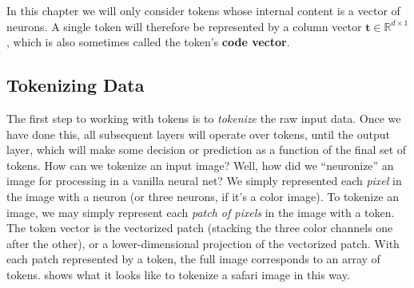 In this chapter we will only consider tokens whose internal content is a vector of neurons. A single token will therefore be represented by a column vector $\mathbf{t} \in \mathbb{R}^{d \times 1}$, which is also sometimes called the token's \textbf{code vector}.






\subsection{Tokenizing Data}
The first step to working with tokens is to \textit{tokenize} the raw input data. Once we have done this, all subsequent layers will operate over tokens, until the output layer, which will make some decision or prediction as a function of the final set of tokens. How can we tokenize an input image? Well, how did we ``neuronize'' an image for processing in a vanilla neural net? We simply represented each \textit{pixel} in the image with a neuron (or three neurons, if it's a color image). To tokenize an image, we may simply represent each \textit{patch of pixels} in the image with a token. The token vector is the vectorized patch (stacking the three color channels one after the other), or a lower-dimensional projection of the vectorized patch.
With each patch represented by a token, the full image corresponds to an array of tokens. \Fig{\ref{fig:transformers:tokenization}} shows what it looks like to tokenize a safari image in this way.


